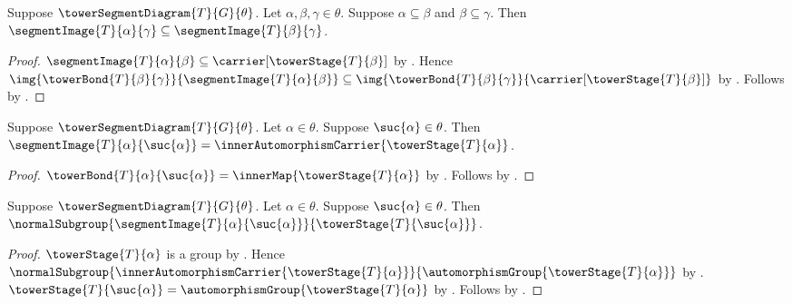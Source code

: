 \begin{theorem}\label{segment_images_nested}
    Suppose $\towerSegmentDiagram{T}{G}{\theta}$.
    Let $\alpha,\beta,\gamma\in\theta$.
    Suppose $\alpha\subseteq\beta$ and
        $\beta\subseteq\gamma$.
    Then $\segmentImage{T}{\alpha}{\gamma}\subseteq
        \segmentImage{T}{\beta}{\gamma}$.
\end{theorem}
\begin{proof}
    $\segmentImage{T}{\alpha}{\beta}\subseteq
        \carrier[\towerStage{T}{\beta}]$ by
        .
    Hence
        $\img{\towerBond{T}{\beta}{\gamma}}
                {\segmentImage{T}{\alpha}{\beta}}
            \subseteq
        \img{\towerBond{T}{\beta}{\gamma}}
                {\carrier[\towerStage{T}{\beta}]}$ by
        .
    Follows by
        .
\end{proof}

\begin{proposition}\label{segment_image_immediate_successor}
    Suppose $\towerSegmentDiagram{T}{G}{\theta}$.
    Let $\alpha\in\theta$.
    Suppose $\suc{\alpha}\in\theta$.
    Then $\segmentImage{T}{\alpha}{\suc{\alpha}}=
        \innerAutomorphismCarrier{\towerStage{T}{\alpha}}$.
\end{proposition}
\begin{proof}
    $\towerBond{T}{\alpha}{\suc{\alpha}}=
        \innerMap{\towerStage{T}{\alpha}}$ by
        .
    Follows by
        .
\end{proof}

\begin{proposition}\label{segment_image_immediate_successor_normal}
    Suppose $\towerSegmentDiagram{T}{G}{\theta}$.
    Let $\alpha\in\theta$.
    Suppose $\suc{\alpha}\in\theta$.
    Then $\normalSubgroup
        {\segmentImage{T}{\alpha}{\suc{\alpha}}}
        {\towerStage{T}{\suc{\alpha}}}$.
\end{proposition}
\begin{proof}
    $\towerStage{T}{\alpha}$ is a group by
        .
    Hence $\normalSubgroup
        {\innerAutomorphismCarrier{\towerStage{T}{\alpha}}}
        {\automorphismGroup{\towerStage{T}{\alpha}}}$ by
        .
    $\towerStage{T}{\suc{\alpha}}=
        \automorphismGroup{\towerStage{T}{\alpha}}$ by
        .
    Follows by .
\end{proof}

